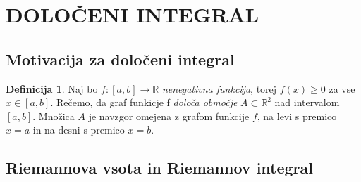 \documentclass[11pt]{article}
\theoremstyle{definition}
\newtheorem{definicija}{Definicija}[section]
\begin{document}

\pagebreak


\section{DOLOČENI INTEGRAL}
\vspace{0.5cm}


\subsection{Motivacija za določeni integral}
\vspace{0.5cm}

\begin{definicija}

Naj bo $f:[a, b] \rightarrow \mathbb{R}$ \textit{nenegativna funkcija}, torej $f(x) \geq 0$ za vse $x \in [a, b]$. Rečemo, da graf funkicje f \textit{določa območje} $A \subset \mathbb{R}^2$  nad intervalom $[a, b]$. Množica $A$ je navzgor omejena z grafom funkcije $f$, na levi s premico $x=a$ in na desni s premico $x=b$.

\end{definicija}
\vspace{0.5cm}


\subsection{Riemannova vsota in Riemannov integral}
\vspace{0.5cm}
\end{document}
